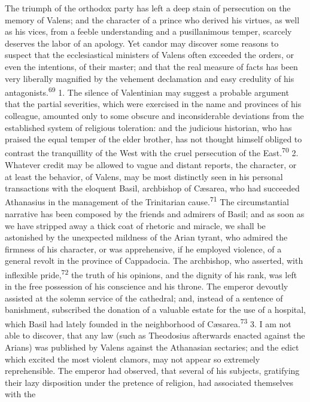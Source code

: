 {{{{{{{{{{{{{{{{{{{{{{{{{{{{{{{{{{{{{{{{{{{{{{{{{{{{{{{{{{{{{{{{{{{{{{{{{{The triumph of the orthodox party has left a deep stain of
persecution on the memory of Valens; and the character of a
prince who derived his virtues, as well as his vices, from a
feeble understanding and a pusillanimous temper, scarcely
deserves the labor of an apology. Yet candor may discover some
reasons to suspect that the ecclesiastical ministers of Valens
often exceeded the orders, or even the intentions, of their
master; and that the real measure of facts has been very
liberally magnified by the vehement declamation and easy
credulity of his antagonists.\textsuperscript{69} 1. The silence of Valentinian
may suggest a probable argument that the partial severities,
which were exercised in the name and provinces of his colleague,
amounted only to some obscure and inconsiderable deviations from
the established system of religious toleration: and the judicious
historian, who has praised the equal temper of the elder brother,
has not thought himself obliged to contrast the tranquillity of
the West with the cruel persecution of the East.\textsuperscript{70} 2. Whatever
credit may be allowed to vague and distant reports, the
character, or at least the behavior, of Valens, may be most
distinctly seen in his personal transactions with the eloquent
Basil, archbishop of Cæsarea, who had succeeded Athanasius in the
management of the Trinitarian cause.\textsuperscript{71} The circumstantial
narrative has been composed by the friends and admirers of Basil;
and as soon as we have stripped away a thick coat of rhetoric and
miracle, we shall be astonished by the unexpected mildness of the
Arian tyrant, who admired the firmness of his character, or was
apprehensive, if he employed violence, of a general revolt in the
province of Cappadocia. The archbishop, who asserted, with
inflexible pride,\textsuperscript{72} the truth of his opinions, and the dignity
of his rank, was left in the free possession of his conscience
and his throne. The emperor devoutly assisted at the solemn
service of the cathedral; and, instead of a sentence of
banishment, subscribed the donation of a valuable estate for the
use of a hospital, which Basil had lately founded in the
neighborhood of Cæsarea.\textsuperscript{73} 3. I am not able to discover, that
any law (such as Theodosius afterwards enacted against the
Arians) was published by Valens against the Athanasian sectaries;
and the edict which excited the most violent clamors, may not
appear so extremely reprehensible. The emperor had observed, that
several of his subjects, gratifying their lazy disposition under
the pretence of religion, had associated themselves with the
}}}}}}}}}}}}}}}}}}}}}}}}}}}}}}}}}}}}}}}}}}}}}}}}}}}}}}}}}}}}}}}}}}}}}}}}}}
